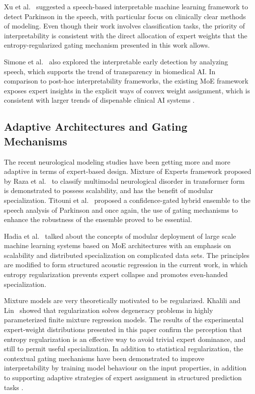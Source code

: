 \documentclass{customIEEEsingle}
\begin{document}
	Xu et al.~\cite{xu-2025} suggested a speech-based interpretable machine learning framework to detect Parkinson in the speech, with particular focus on clinically clear methods of modeling. Even though their work involves classification tasks, the priority of interpretability is consistent with the direct allocation of expert weights that the entropy-regularized gating mechanism presented in this work allows.
	
	Simone et al.~\cite{simone-2025} also explored the interpretable early detection by analyzing speech, which supports the trend of transparency in biomedical AI. In comparison to post-hoc interpretability frameworks, the existing MoE framework exposes expert insights in the explicit ways of convex weight assignment, which is consistent with larger trends of dispenable clinical AI systems \cite{chaithanya-2025}.
	
	\subsection{Adaptive Architectures and Gating Mechanisms}
	
	The recent neurological modeling studies have been getting more and more adaptive in terms of expert-based design. Mixture of Experts framework proposed by Raza et al.~\cite{raza-2025} to classify multimodal neurological disorder in transformer form is demonstrated to possess scalability, and has the benefit of modular specialization. Titouni et al.~\cite{titouni-2026} proposed a confidence-gated hybrid ensemble to the speech analysis of Parkinson and once again, the use of gating mechanisms to enhance the robustness of the ensemble proved to be essential.
	
	Hadia et al.~\cite{hadia-2025} talked about the concepts of modular deployment of large scale machine learning systems based on MoE architectures with an emphasis on scalability and distributed specialization on complicated data sets. The principles are modified to form structured acoustic regression in the current work, in which entropy regularization prevents expert collapse and promotes even-handed specialization.
	
	Mixture models are very theoretically motivated to be regularized. Khalili and Lin~\cite{khalili-2013} showed that regularization solves degeneracy problems in highly parameterized finite mixture regression models. The results of the experimental expert-weight distributions presented in this paper confirm the perception that entropy regularization is an effective way to avoid trivial expert dominance, and still to permit useful specialization. In addition to statistical regularization, the contextual gating mechanisms have been demonstrated to improve interpretability by training model behaviour on the input properties, in addition to supporting adaptive strategies of expert assignment in structured prediction tasks \cite{al-shedivat-2020}.
	
\end{document}
